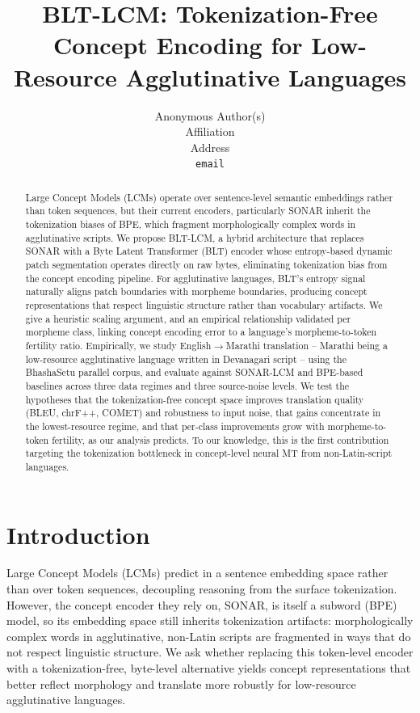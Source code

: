 \documentclass{article}
\title{BLT-LCM: Tokenization-Free Concept Encoding for Low-Resource Agglutinative Languages}
\author{%
  Anonymous Author(s) \\
  Affiliation \\
  Address \\
  \texttt{email} \\
}
\begin{document}
\maketitle
\begin{abstract}
Large Concept Models (LCMs) operate over sentence-level semantic embeddings rather than token sequences, but their current encoders, particularly SONAR inherit the tokenization biases of BPE, which fragment morphologically complex words in agglutinative scripts. We propose BLT-LCM, a hybrid architecture that replaces SONAR with a Byte Latent Transformer (BLT) encoder whose entropy-based dynamic patch segmentation operates directly on raw bytes, eliminating tokenization bias from the concept encoding pipeline. For agglutinative languages, BLT's entropy signal naturally aligns patch boundaries with morpheme boundaries, producing concept representations that respect linguistic structure rather than vocabulary artifacts. We give a heuristic scaling argument, and an empirical relationship validated per morpheme class, linking concept encoding error to a language's morpheme-to-token fertility ratio. Empirically, we study English$\rightarrow$Marathi translation -- Marathi being a low-resource agglutinative language written in Devanagari script -- using the BhashaSetu parallel corpus, and evaluate against SONAR-LCM and BPE-based baselines across three data regimes and three source-noise levels. We test the hypotheses that the tokenization-free concept space improves translation quality (BLEU, chrF++, COMET) and robustness to input noise, that gains concentrate in the lowest-resource regime, and that per-class improvements grow with morpheme-to-token fertility, as our analysis predicts. To our knowledge, this is the first contribution targeting the tokenization bottleneck in concept-level neural MT from non-Latin-script languages.
\end{abstract}

\section{Introduction}

Large Concept Models (LCMs) predict in a sentence embedding space rather than over token sequences, decoupling reasoning from the surface tokenization. However, the concept encoder they rely on, SONAR, is itself a subword (BPE) model, so its embedding space still inherits tokenization artifacts: morphologically complex words in agglutinative, non-Latin scripts are fragmented in ways that do not respect linguistic structure. We ask whether replacing this token-level encoder with a tokenization-free, byte-level alternative yields concept representations that better reflect morphology and translate more robustly for low-resource agglutinative languages.
\end{document}
